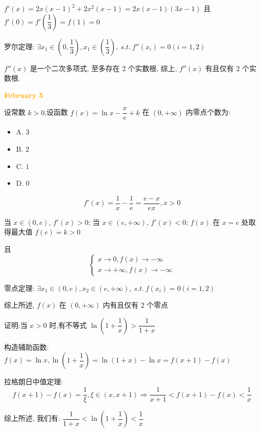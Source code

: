\begin{solution}

	$f'(x) = 2x(x-1)^{2}+2x^{2}(x-1) = 2x(x-1)(3x-1)$ 且 $f'(0) = f'(\dfrac{1}{3}) = f(1) = 0$

	罗尔定理: $\exists x_{1}\in (0,\dfrac{1}{3}), x_{1}\in(\dfrac{1}{3}),\ s.t.\ f''(x_{i}) = 0(i = 1,2)$

	$f''(x)$ 是一个二次多项式, 至多存在 $2$ 个实数根, 综上, $f''(x)$ 有且仅有 $2$ 个实数根.
\end{solution}

\textcolor{orange}{\textbf{February 5}}

\begin{example}[][Exam: 28.1.9]
	设常数 $k>0$,设函数 $f(x)=\ln x-\dfrac{x}{e}+k$ 在 $(0,+\infty)$ 内零点个数为:
\begin{itemize}
	\item A. $3$
	\item B. $2$
	\item C. $1$
	\item D. $0$
\end{itemize}
\end{example}

\begin{solution}

	$$f'(x) = \dfrac{1}{x}-\dfrac{1}{e} = \dfrac{e-x}{ex}, x > 0$$

	当 $x\in(0,e)$, $f'(x) > 0$; 当 $x\in(e,+\infty)$, $f'(x) < 0$; $f(x)$ 在 $x = e$ 处取得最大值 $f(e) = k > 0$

	且 $$\begin{cases}
		x\to 0, f(x)\to -\infty\\
		x\to +\infty, f(x)\to -\infty
	\end{cases}$$

	零点定理: $\exists x_{1}\in(0,e),x_{2}\in(e,+\infty),\ s.t.\ f(x_{i}) = 0(i = 1,2)$

	综上所述, $f(x)$ 在 $(0,+\infty)$ 内有且仅有 $2$ 个零点
\end{solution}

\begin{example}[][Exam: 28.1.10]
	证明:当 $x>0$ 时,有不等式 $\ln(1+\dfrac{1}{x})>\dfrac{1}{1+x}$
\end{example}

\begin{solution}
	
	构造辅助函数: $f(x) = \ln x, \ln(1+\dfrac{1}{x}) = \ln(1+x) -\ln x = f(x+1)-f(x)$

	拉格朗日中值定理: $$f(x+1)-f(x) = \dfrac{1}{\xi}, \xi\in(x,x+1)\Rightarrow \dfrac{1}{x+1}< f(x+1)-f(x) < \dfrac{1}{x}$$

	综上所述, 我们有: $\dfrac{1}{1+x} < \ln(1+\dfrac{1}{x}) < \dfrac{1}{x}$
\end{solution}

